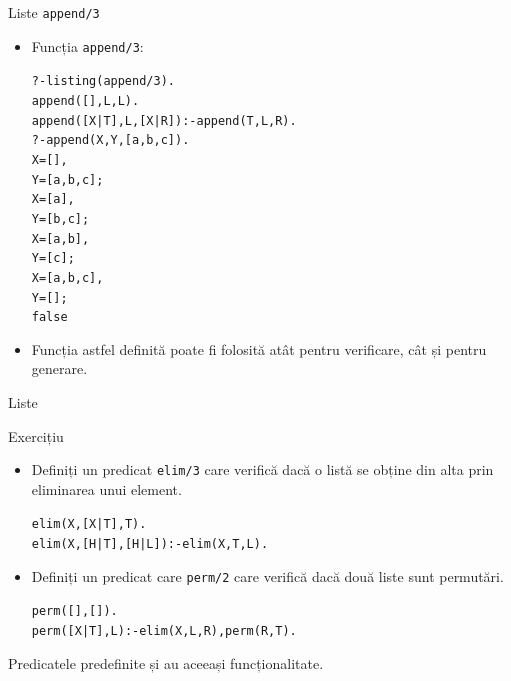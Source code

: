 \documentclass[xcolor=x11names,compress,10pt]{beamer}
\begin{document}
\begin{frame}{Liste \texttt{append/3}}

\vspace*{0.3cm}

\begin{itemize}
\item Funcția \texttt{append/3}:
\begin{alltt}
?- listing(append/3).\\
append([],L,L).\\
append([X|T],L, [X|R]) :- append(T,L,R).\\

?- append(X,Y,[a,b,c]).\\
X = [],\\
Y = [a, b, c] ;\\
X = [a],\\
Y = [b, c] ;\\
X = [a, b],\\
Y = [c] ;\\
X = [a, b, c],\\
Y = [] ;\\
\alert{false}
\end{alltt}
\item Funcția astfel definită poate fi folosită 
atât pentru verificare, cât și pentru generare. 
\end{itemize}


\end{frame}

\begin{frame}{Liste}
\vspace*{0.3cm}

\begin{block}{Exercițiu}
\begin{itemize}
\item Definiți un predicat \texttt{elim/3} care verifică dacă o  listă se obține din alta prin eliminarea unui element.
\medskip\pause
\begin{alltt}
elim(X, [X|T], T).\\
elim(X, [H|T], [H|L]) :- elim(X,T,L).
\end{alltt}


\medskip\pause

\item Definiți un predicat care \texttt{perm/2} care verifică dacă două liste sunt permutări.
\medskip\pause
\begin{alltt}
perm([],[]).
perm([X|T],L) :- elim(X,L,R), perm(R,T).
\end{alltt}

\end{itemize}
\end{block}
\pause
Predicatele predefinite  și 
 au aceeași funcționalitate. 
\end{frame}
\end{document}
